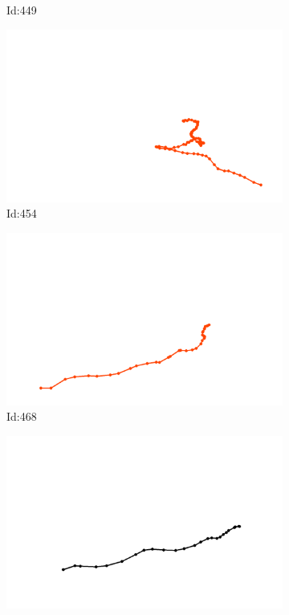\documentclass[12pt,twoside]{report}
\begin{document}
\begin{figure}
\begin{subfigure}[b]{0.20\textwidth}
\caption{Id:449}
\end{subfigure}
\begin{subfigure}[b]{0.20\textwidth}
\centering
\includegraphics[width=\textwidth]{../trajectories/454.png}
\caption{Id:454}
\end{subfigure}
\begin{subfigure}[b]{0.20\textwidth}
\centering
\includegraphics[width=\textwidth]{../trajectories/468.png}
\caption{Id:468}
\end{subfigure}
\begin{subfigure}[b]{0.20\textwidth}
\centering
\includegraphics[width=\textwidth]{../trajectories/476.png}

\end{subfigure}
\end{figure}
\end{document}
